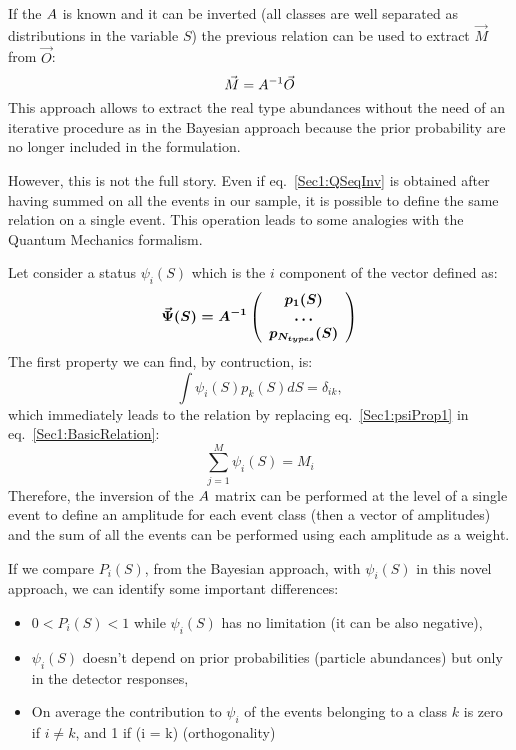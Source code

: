 If the $\boldmath{A}$ is known and it can be inverted (all classes are
well separated as distributions in the variable $S$) the previous relation can
be used to extract $\vec{M}$ from $\vec{O}$:
\begin{equation}
\label{Sec1:QSeqInv}
\vec{M} = \boldmath{A^{-1}} \vec{O}
\end{equation}
This approach allows to extract the real type abundances without the need of
an iterative procedure as in the Bayesian approach because the prior
probability are no longer included in the formulation.

However, this is not the full story. Even if eq.~\ref{Sec1:QSeqInv} is
obtained after having summed on all the events in our sample, it is possible
to define the same relation on a single event. This operation leads to some
analogies with the Quantum Mechanics formalism.

Let consider a status $\psi_{i}(S)$ which is the $i$ component of the vector
defined as:
\begin{equation}
\label{Sec1:psi}
\vec{\Psi}(S) = \boldmath{A^{-1}} 
\left(
\begin{array}{c}
p_{1}(S)\\
\ldots \\
p_{N_{types}}(S)
\end{array}
\right)
\end{equation}
The first property we can find, by contruction, is:
\begin{equation}
\label{Sec1:psiProp1}
\int \psi_{i}(S) p_{k}(S) dS = \delta_{ik},
\end{equation}
which immediately leads to the relation by replacing eq.~\ref{Sec1:psiProp1} in eq.~\ref{Sec1:BasicRelation}:
\begin{equation}
\label{Sec1:psi}
\sum\limits_{j=1}^{M}\psi_{i}(S) = M_{i}
\end{equation}
Therefore, the inversion of the $\boldmath{A}$ matrix can be performed at the
level of a single event to define an amplitude for each event class (then a
vector of amplitudes) and the sum of all the events can be performed using
each amplitude as a weight.

If we compare $P_{i}(S)$, from the Bayesian approach, with $\psi_{i}(S)$ in
this novel approach, we can identify some important differences:
\begin{itemize}
\item $0 < P_{i}(S) < 1$ while $\psi_{i}(S)$ has no limitation (it can be also
  negative),\\
\item $\psi_{i}(S)$ doesn't depend on prior probabilities (particle
  abundances) but only in the detector responses,\\
\item On average the contribution to
  $\psi_{i}$ of the events belonging to a class $k$ is zero if $i \neq k$, and
  1 if (i = k) (orthogonality)
\end{itemize}



